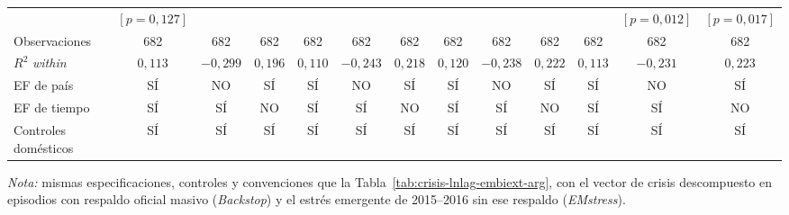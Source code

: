 \documentclass[11pt]{article}
\begin{document}
\begin{landscape}
\begin{table}
\begin{adjustbox}{max width=\linewidth, max totalheight=\tablaalto\textheight}
\begin{tabular}{l c ccc ccc ccc cc}
 & $[p=0{,}127]$ &  &  &  &  &  &  &  &  &  & $[p=0{,}012]$ & $[p=0{,}017]$ \\
\addlinespace
Observaciones & 682 & 682 & 682 & 682 & 682 & 682 & 682 & 682 & 682 & 682 & 682 & 682 \\
$R^2$ \textit{within} & $0{,}113$ & $-0{,}299$ & $0{,}196$ & $0{,}110$ & $-0{,}243$ & $0{,}218$ & $0{,}120$ & $-0{,}238$ & $0{,}222$ & $0{,}113$ & $-0{,}231$ & $0{,}223$ \\
\midrule
EF de país & SÍ & NO & SÍ & SÍ & NO & SÍ & SÍ & NO & SÍ & SÍ & NO & SÍ \\
EF de tiempo & SÍ & SÍ & NO & SÍ & SÍ & NO & SÍ & SÍ & NO & SÍ & SÍ & NO \\
Controles domésticos & SÍ & SÍ & SÍ & SÍ & SÍ & SÍ & SÍ & SÍ & SÍ & SÍ & SÍ & SÍ \\
\bottomrule
\end{tabular}
\end{adjustbox}
\par\smallskip\parbox{\linewidth}{\scriptsize \textit{Nota:} mismas especificaciones, controles y convenciones que la Tabla~\ref{tab:crisis-lnlag-embiext-arg}, con el vector de crisis descompuesto en episodios con respaldo oficial masivo (\textit{Backstop}) y el estrés emergente de 2015--2016 sin ese respaldo (\textit{EMstress}).}
\end{table}
\end{landscape}
\end{document}
